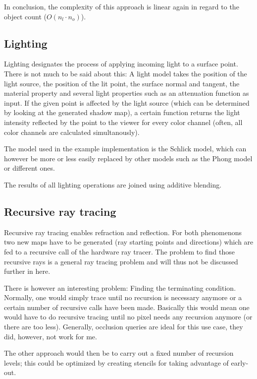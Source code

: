 \documentclass[english,fleqn,10pt,twocolumn]{article}
\begin{document}
In conclusion, the complexity of this approach is linear again in regard to the object count ($O(n_l \cdot n_o)$).

\subsection{Lighting}

Lighting designates the process of applying incoming light to a surface point. There is not much to be said about this: A light model takes the position of the light source, the position of the lit point, the surface normal and
tangent, the material property and several light properties such as an attenuation function as input. If the given point is affected by the light source (which can be determined by looking at the generated shadow map), a certain
function returns the light intensity reflected by the point to the viewer for every color channel (often, all color channels are calculated simultanously).

The model used in the example implementation is the Schlick model\cite{SCHL93}, which can however be more or less easily replaced by other models such as the Phong model or different ones.

The results of all lighting operations are joined using additive blending.

\subsection{Recursive ray tracing}

Recursive ray tracing enables refraction and reflection. For both phenomenons two new maps have to be generated (ray starting points and directions) which are fed to a recursive call of the hardware ray tracer. The problem to find those
recursive rays is a general ray tracing problem and will thus not be discussed further in here.

There is however an interesting problem: Finding the terminating condition. Normally, one would simply trace until no recursion is necessary anymore or a certain number of recursive calls have been made. Basically this would mean
one would have to do recursive tracing until no pixel needs any recursion anymore (or there are too less). Generally, occlusion queries are ideal for this use case, they did, however, not work for me.

The other approach would then be to carry out a fixed number of recursion levels; this could be optimized by creating stencils for taking advantage of early-out.
\end{document}
